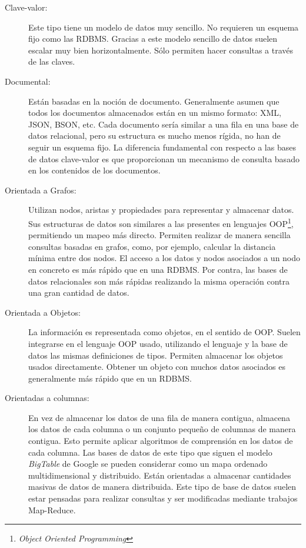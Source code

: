 \begin{description}
\item[Clave-valor:] Este tipo tiene un modelo de datos muy
  sencillo. No requieren un esquema fijo como las RDBMS. Gracias a
  este modelo sencillo de datos suelen escalar muy bien
  horizontalmente. Sólo permiten hacer consultas a través de las
  claves.

\item[Documental:] Están basadas en la noción de
  documento. Generalmente asumen que todos los documentos almacenados
  están en un mismo formato: XML, JSON, BSON, etc. Cada documento
  sería similar a una fila en una base de datos relacional, pero su
  estructura es mucho menos rígida, no han de seguir un esquema
  fijo. La diferencia fundamental con respecto a las bases de datos
  clave-valor es que proporcionan un mecanismo de consulta basado en
  los contenidos de los documentos.

\item[Orientada a Grafos:] Utilizan nodos, aristas y propiedades para
  representar y almacenar datos. Sus estructuras de datos son
  similares a las presentes en lenguajes OOP\footnote{\emph{Object
      Oriented Programming}}, permitiendo un mapeo más
  directo. Permiten realizar de manera sencilla consultas basadas en
  grafos, como, por ejemplo, calcular la distancia mínima entre dos
  nodos. El acceso a los datos y nodos asociados a un nodo en concreto
  es más rápido que en una RDBMS. Por contra, las bases de datos
  relacionales son más rápidas realizando la misma operación contra
  una gran cantidad de datos.

\item[Orientada a Objetos:] La información es representada como
  objetos, en el sentido de OOP. Suelen integrarse en el lenguaje OOP
  usado, utilizando el lenguaje y la base de datos las mismas
  definiciones de tipos. Permiten almacenar los objetos usados
  directamente. Obtener un objeto con muchos datos asociados es
  generalmente más rápido que en un RDBMS.

\item[Orientadas a columnas:] En vez de almacenar los datos de una
  fila de manera contigua, almacena los datos de cada columna o un
  conjunto pequeño de columnas de manera contigua. Esto permite
  aplicar algoritmos de comprensión en los datos de cada columna. Las
  bases de datos de este tipo que siguen el modelo
  \emph{BigTable}\cite{BIG-TABLE} de Google se pueden considerar como un mapa
  ordenado multidimensional y distribuido. Están orientadas a
  almacenar cantidades masivas de datos de manera distribuida. Este
  tipo de base de datos suelen estar pensadas para realizar consultas
  y ser modificadas mediante trabajos Map-Reduce\cite{MAP-REDUCE}.

\end{description}

